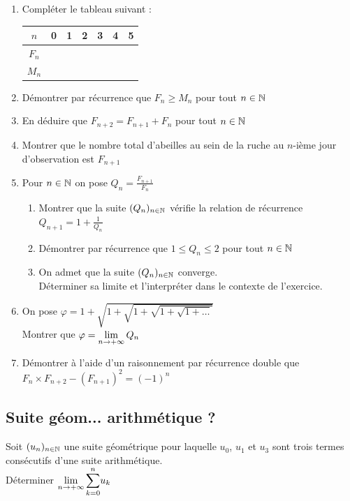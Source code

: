 \documentclass[oneside,12pt]{book}          %
\begin{document}
\begin{enumerate}
    \item Compléter le tableau suivant :
    \begin{center}
        \renewcommand{\arraystretch}{1.5}
        \setlength{\tabcolsep}{25pt}
        \begin{tabular}{|c|c|c|c|c|c|c|}\hline
            $n$ & 0 & 1 & 2 & 3 & 4 & 5 \\ \hline
            $F_n$ & & & & & & \\ \hline
            $M_n$ & & & & & & \\ \hline
        \end{tabular}
    \end{center}

    \item Démontrer par récurrence que $F_n\geq M_n$ pour tout ${n\in\mathbb N}$
    \item En déduire que $F_{n+2}=F_{n+1}+F_n$ pour tout ${n\in\mathbb N}$
    \item Montrer que le nombre total d'abeilles au sein de la ruche au $n$-ième jour d'observation est $F_{n+1}$
    \item Pour ${n\in\mathbb N}$ on pose $Q_n=\frac{F_{n+1}}{F_n}$
    \begin{enumerate}
        \item Montrer que la suite $(Q_n)_{{n\in\mathbb N}}$ vérifie la relation de récurrence $Q_{n+1}=1+\frac{1}{Q_n}$
        \item Démontrer par récurrence que $1\leq Q_n\leq2$ pour tout ${n\in\mathbb N}$
        \item On admet que la suite $(Q_n)_{{n\in\mathbb N}}$ converge.\\Déterminer sa limite et l'interpréter dans le contexte de l'exercice.
    \end{enumerate}
    \item On pose $\varphi = 1+\sqrt{1+\sqrt{1+\sqrt{1+\sqrt{1+\ldots}}}}$\\[5pt]
    Montrer que $\varphi={\lim\limits_{n\to +\infty}}\, Q_n$
    \item Démontrer à l'aide d'un raisonnement par récurrence double que $F_n\times F_{n+2}-\left(F_{n+1}\right)^2=(-1)^n$
\end{enumerate}



\subsection{Suite géom... arithmétique ?}
Soit ${(u_{n})_{n\in\mathbb N}}$ une suite géométrique pour laquelle $u_0$, $u_1$ et $u_3$ sont trois termes consécutifs d'une suite arithmétique.\\
Déterminer ${\lim\limits_{n\to +\infty}}\, {\displaystyle\sum_{k=0}^{n}}u_k$
\end{document}
